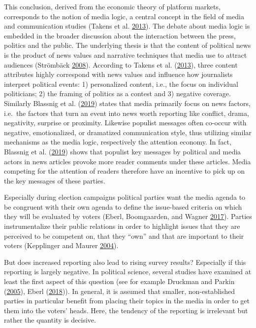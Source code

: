 \documentclass[
]{article}
\begin{document}
This conclusion, derived from the economic theory of platform markets,
corresponds to the notion of media logic, a central concept in the field
of media and communication studies (Takens et al.
\protect\hyperlink{ref-takens_media_2013}{2013}). The debate about media
logic is embedded in the broader discussion about the interaction
between the press, politics and the public. The underlying thesis is
that the content of political news is the product of news values and
narrative techniques that media use to attract audiences (Strömbäck
\protect\hyperlink{ref-stromback_four_2008}{2008}). According to Takens
et al. (\protect\hyperlink{ref-takens_media_2013}{2013}), three content
attributes highly correspond with news values and influence how
journalists interpret political events: 1) personalized content, i.e.,
the focus on individual politicians; 2) the framing of politics as a
contest and 3) negative coverage. Similarly Blassnig et al.
(\protect\hyperlink{ref-blassnig_hitting_2019}{2019}) states that media
primarily focus on news factors, i.e.~the factors that turn an event
into news worth reporting like conflict, drama, negativity, surprise or
proximity. Likewise populist messages often co-occur with negative,
emotionalized, or dramatized communication style, thus utilizing similar
mechanisms as the media logic, respectively the attention economy. In
fact, Blassnig et al.
(\protect\hyperlink{ref-blassnig_hitting_2019}{2019}) shows that
populist key messages by political and media actors in news articles
provoke more reader comments under these articles. Media competing for
the attention of readers therefore have an incentive to pick up on the
key messages of these parties.

Especially during election campaigns political parties want the media
agenda to be congruent with their own agenda to define the issue-based
criteria on which they will be evaluated by voters (Eberl, Boomgaarden,
and Wagner \protect\hyperlink{ref-eberl_one_2017}{2017}). Parties
instrumentalize their public relations in order to highlight issues that
they are perceived to be competent on, that they ``own'' and that are
important to their voters (Kepplinger and Maurer
\protect\hyperlink{ref-kepplinger_einfluss_2004}{2004}).

But does increased reporting also lead to rising survey results?
Especially if this reporting is largely negative. In political science,
several studies have examined at least the first aspect of this question
(see for example Druckman and Parkin
(\protect\hyperlink{ref-druckman_impact_2005}{2005}), Eberl
(\protect\hyperlink{ref-eberl_lying_2018}{2018})). In general, it is
assumed that smaller, non-established parties in particular benefit from
placing their topics in the media in order to get them into the voters'
heads. Here, the tendency of the reporting is irrelevant but rather the
quantity is decisive.
\end{document}

